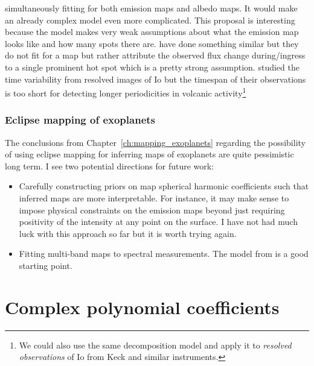 \documentclass[12pt,dvipsnames]{report}
\begin{document}
simultaneously fitting for both emission maps and albedo maps. It would make an already 
complex model even more complicated.
This proposal is interesting because the model makes very weak assumptions about what the 
emission map looks like and how many spots there are. \citet{2010Icar..209..625R} have done 
something similar but they do not fit for a map but rather attribute the observed 
flux change during/ingress to a single prominent hot spot which is a pretty strong 
assumption. \citet{2016Icar..280..378D} studied the time variability from resolved images 
of Io but the timespan of their observations is too short for detecting longer 
periodicities in volcanic activity\footnote{We could also use the same decomposition 
model and apply it to \emph{resolved observations} of Io from Keck and similar 
instruments.}

\subsection{Eclipse mapping of exoplanets}
The conclusions from Chapter~\ref{ch:mapping_exoplanets} regarding the possibility of 
using eclipse mapping for inferring maps of exoplanets are quite pessimistic long term. I see 
two potential directions for future work:
\begin{itemize}
    \item Carefully constructing priors on map spherical harmonic coefficients such that 
    inferred maps are more interpretable. For instance, it may make sense to impose 
    physical constraints on the emission maps beyond just requiring positivity of the intensity 
    at any point on the surface. I have not had much luck with this approach so far but 
    it is worth trying again.
    \item Fitting multi-band maps to spectral measurements. The model from \citet{arXiv:2110.08159} 
    is a good starting point.
\end{itemize}


\appendix

\chapter{Complex polynomial coefficients}
\label{app:complex_poly}
\end{document}
